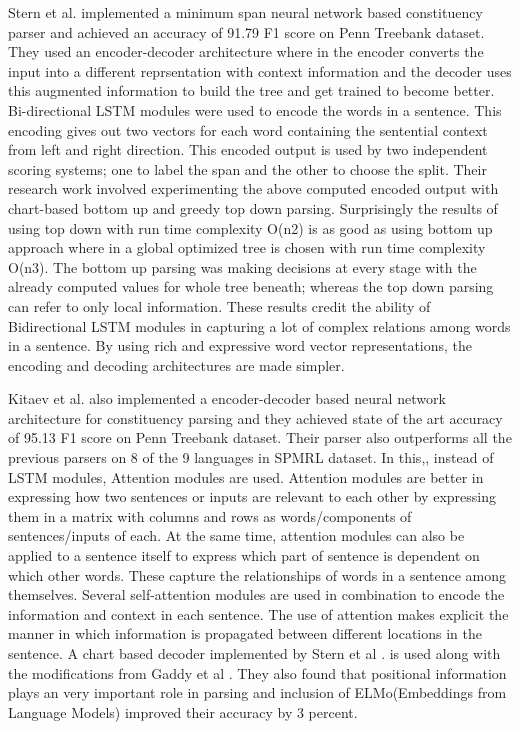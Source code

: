 \documentclass[a4paper, 11pt]{article}
\begin{document}
Stern et al. \parencite*{Stern2017} implemented a minimum span neural network based constituency parser and achieved an accuracy of 91.79 F1 score on Penn Treebank dataset. They used an encoder-decoder architecture where in the encoder converts the input into a different reprsentation with context information and the decoder uses this augmented information to build the tree and get trained to become better. Bi-directional LSTM modules were used to encode the words in a sentence. This encoding gives out two vectors for each word containing the sentential context from left and right direction. This encoded output is used by two independent scoring systems; one to label the span and the other to choose the split. Their research work involved experimenting the above computed encoded output with chart-based bottom up and greedy top down parsing. Surprisingly the results of using top down with run time complexity O(n2) is as good as using bottom up approach where in a global optimized tree is chosen with run time complexity O(n3). The bottom up parsing was making decisions at every stage with the already computed values for whole tree beneath; whereas the top down parsing can refer to only local information. These results credit the ability of Bidirectional LSTM modules in capturing a lot of complex relations among words in a sentence. By using rich and expressive word vector representations, the encoding and decoding architectures are made simpler. 

Kitaev et al. \parencite*{Kitaev2019} also implemented a encoder-decoder based neural network architecture for constituency parsing and they achieved state of the art accuracy of 95.13 F1 score on Penn Treebank dataset. Their parser also outperforms all the previous parsers on 8 of the 9 languages in SPMRL dataset. In this,, instead of LSTM modules, Attention modules \parencite*{Vaswani2017} are used. Attention modules are better in expressing how two sentences or inputs are relevant to each other by expressing them in a matrix with columns and rows as words/components of sentences/inputs of each. At the same time, attention modules can also be applied to a sentence itself to express which part of sentence is dependent on which other words. These capture the relationships of words in a sentence among themselves. Several self-attention modules are used in combination to encode the information and context in each sentence. The use of attention makes explicit the manner in which information is propagated between different locations in the sentence. A chart based decoder implemented by Stern et al \parencite*{Stern2017}. is used along with the modifications from Gaddy et al \parencite*{Gaddy2018}. They also found that positional information plays an very important role in parsing and inclusion of ELMo(Embeddings from Language Models) improved their accuracy by 3 percent. 
\end{document}
